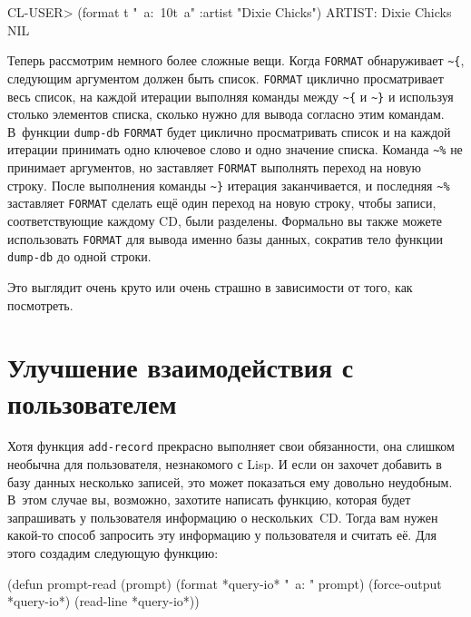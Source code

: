 \begin{myverb}
CL-USER> (format t "~a:~10t~a" :artist "Dixie Chicks")
ARTIST:   Dixie Chicks
NIL
\end{myverb}

Теперь рассмотрим немного более сложные вещи. Когда \lstinline{FORMAT} обнаруживает
\lstinline!~{!, следующим аргументом должен быть список. \lstinline{FORMAT} циклично
  просматривает весь список, на каждой итерации выполняя команды между \lstinline!~{! и
    \lstinline!~}! и используя столько элементов списка, сколько нужно для вывода согласно
  этим командам. В~функции \lstinline{dump-db} \lstinline{FORMAT} будет циклично просматривать
  список и на каждой итерации принимать одно ключевое слово и одно значение
  списка. Команда \lstinline!~%! не принимает аргументов, но заставляет \lstinline{FORMAT}
  выполнять переход на новую строку. После выполнения команды \lstinline!~}! итерация
заканчивается, и последняя \lstinline!~%! заставляет \lstinline{FORMAT} сделать ещё один
переход на новую строку, чтобы записи, соответствующие каждому CD, были разделены.
Формально вы также можете использовать \lstinline{FORMAT} для вывода именно базы данных,
сократив тело функции \lstinline{dump-db} до одной строки.


Это выглядит очень круто или очень страшно в зависимости от того, как посмотреть.

\section{Улучшение взаимодействия с пользователем}

Хотя функция \lstinline{add-record} прекрасно выполняет свои обязанности, она слишком необычна
для пользователя, незнакомого с Lisp. И если он захочет добавить в базу данных несколько
записей, это может показаться ему довольно неудобным. В~этом случае вы, возможно, захотите
написать функцию, которая будет запрашивать у пользователя информацию о нескольких~CD.
Тогда вам нужен какой-то способ запросить эту информацию у пользователя и считать её. Для
этого создадим следующую функцию:

\begin{myverb}
(defun prompt-read (prompt)
 (format *query-io* "~a: " prompt)
 (force-output *query-io*)
 (read-line *query-io*))
\end{myverb}

